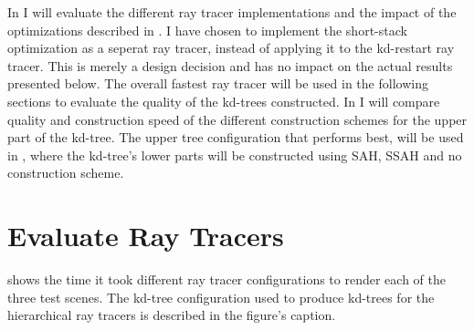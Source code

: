 
In  I will evaluate the different ray tracer
implementations and the impact of the optimizations described in
. I have chosen to implement the
short-stack optimization as a seperat ray tracer, instead of applying it to the
kd-restart ray tracer. This is merely a design decision and has no impact on the
actual results presented below. 
The overall fastest ray tracer will be used in the following sections to
evaluate the quality of the kd-trees constructed. In
 I will compare quality and construction speed
of the different construction schemes for the upper part of the kd-tree. The
upper tree configuration that performs best, will be used in
, where the kd-tree's lower parts will be
constructed using SAH, SSAH and no construction scheme.


\section{Evaluate Ray Tracers}\label{sec:evaluateRayTracer}

 shows the time it took different ray tracer
configurations to render each of the three test scenes. The kd-tree
configuration used to produce kd-trees for the hierarchical ray tracers is
described in the figure's caption.

\newcommand{\tabelMoeller}{
  \begin{tabular}{c}
    Moeller- \\ Trumbore
  \end{tabular}
}

